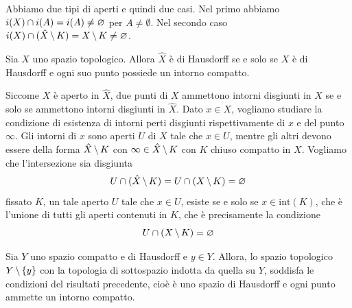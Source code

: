 \documentclass[a4paper]{article}
\begin{document}
\begin{snippetproof}{}
    Abbiamo due tipi di aperti e quindi due casi.
    Nel primo abbiamo \(i(X) \cap i(A) = i(A) \neq \varnothing\)
    per \(A \neq \emptyset\).
    Nel secondo caso
    \(i(X) \cap (\hat{X} \,\backslash\, K) = X \,\backslash\, K \neq \varnothing\).
\end{snippetproof}

\begin{snippetproposition}{}
    Sia \(X\) uno spazio topologico.
    Allora \(\hat{X}\) è di Hausdorff se e solo se \(X\) è di Hausdorff
    e ogni suo punto possiede un intorno compatto.
\end{snippetproposition}

\begin{snippetproof}{}
    Siccome \(X\) è aperto in \(\hat{X}\), due punti di \(X\)
    ammettono intorni disgiunti in \(X\) se e solo se ammettono intorni disgiunti in \(\hat{X}\).
    Dato \(x\in X\), vogliamo studiare la condizione di esistenza di intorni perti disgiunti
    rispettivamente di \(x\) e del punto \(\infty\).
    Gli intorni di \(x\) sono aperti \(U\) di \(X\) tale che \(x\in U\),
    mentre gli altri devono essere della forma \(\hat{X} \,\backslash\, K\)
    con \(\infty \in \hat{X} \,\backslash\, K\) con \(K\) chiuso compatto in \(X\).
    Vogliamo che l'intersezione sia disgiunta
    \[
        U \cap (\hat{X} \,\backslash\, K)
        = U \cap (X \,\backslash\, K) = \varnothing
    \]
    fissato \(K\), un tale aperto \(U\) tale che
    \(x \in U\), esiste se e solo se \(x \in \text{int}(K)\),
    che è l'unione di tutti gli aperti contenuti in \(K\), che è precisamente la condizione
    \[
        U \cap (X \,\backslash\, K) = \varnothing
    \]
\end{snippetproof}

\begin{snippetproposition}{}
    Sia \(Y\) uno spazio compatto e di Hausdorff e \(y\in Y\).
    Allora, lo spazio topologico \(Y \,\backslash\, \{y\}\) con la topologia di sottospazio
    indotta da quella su \(Y\), soddisfa le condizioni del risultati precedente,
    cioè è uno spazio di Hausdorff e ogni punto ammette un intorno compatto.
\end{snippetproposition}
\end{document}
